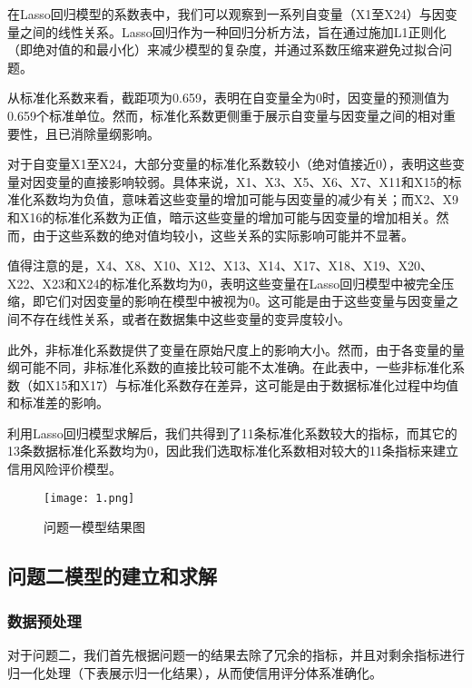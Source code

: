\documentclass[12pt,a4paper]{nmmcm}
\begin{document}
在Lasso回归模型的系数表中，我们可以观察到一系列自变量（X1至X24）与因变量之间的线性关系。Lasso回归作为一种回归分析方法，旨在通过施加L1正则化（即绝对值的和最小化）来减少模型的复杂度，并通过系数压缩来避免过拟合问题。

从标准化系数来看，截距项为0.659，表明在自变量全为0时，因变量的预测值为0.659个标准单位。然而，标准化系数更侧重于展示自变量与因变量之间的相对重要性，且已消除量纲影响。

对于自变量X1至X24，大部分变量的标准化系数较小（绝对值接近0），表明这些变量对因变量的直接影响较弱。具体来说，X1、X3、X5、X6、X7、X11和X15的标准化系数均为负值，意味着这些变量的增加可能与因变量的减少有关；而X2、X9和X16的标准化系数为正值，暗示这些变量的增加可能与因变量的增加相关。然而，由于这些系数的绝对值均较小，这些关系的实际影响可能并不显著。

值得注意的是，X4、X8、X10、X12、X13、X14、X17、X18、X19、X20、X22、X23和X24的标准化系数均为0，表明这些变量在Lasso回归模型中被完全压缩，即它们对因变量的影响在模型中被视为0。这可能是由于这些变量与因变量之间不存在线性关系，或者在数据集中这些变量的变异度较小。

此外，非标准化系数提供了变量在原始尺度上的影响大小。然而，由于各变量的量纲可能不同，非标准化系数的直接比较可能不太准确。在此表中，一些非标准化系数（如X15和X17）与标准化系数存在差异，这可能是由于数据标准化过程中均值和标准差的影响。

利用Lasso回归模型求解后，我们共得到了11条标准化系数较大的指标，而其它的13条数据标准化系数均为0，因此我们选取标准化系数相对较大的11条指标来建立信用风险评价模型。

\begin{figure}
    \centering
    \texttt{[image: 1.png]}
    \caption{问题一模型结果图}
    \label{fig:enter-label}
\end{figure}







\subsection{问题二模型的建立和求解}
\subsubsection{数据预处理}

对于问题二，我们首先根据问题一的结果去除了冗余的指标，并且对剩余指标进行归一化处理（下表展示归一化结果），从而使信用评分体系准确化。
\end{document}
